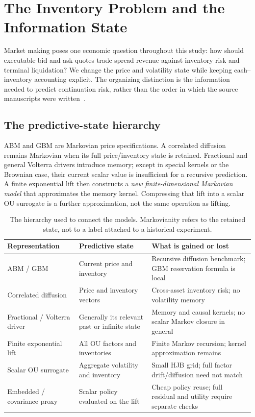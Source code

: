 \chapter{The Inventory Problem and the Information State}
\label{ch:common}
Market making poses one economic question throughout this study: how should executable bid and ask quotes trade spread revenue against inventory risk and terminal liquidation? We change the price and volatility state while keeping cash--inventory accounting explicit. The organizing distinction is the information needed to predict continuation risk, rather than the order in which the source manuscripts were written~\cite{hft1,hft2}.

\section{The predictive-state hierarchy}
ABM and GBM are Markovian price specifications. A correlated diffusion remains Markovian when its full price/inventory state is retained. Fractional and general Volterra drivers introduce memory; except in special kernels or the Brownian case, their current scalar value is insufficient for a recursive prediction. A finite exponential lift then constructs a \emph{new finite-dimensional Markovian model} that approximates the memory kernel. Compressing that lift into a scalar OU surrogate is a further approximation, not the same operation as lifting.

\begin{table}[htbp]\centering\small
\begin{tabularx}{\textwidth}{@{}p{}p{}X@{}}\toprule
Representation & Predictive state & What is gained or lost\\\midrule
ABM / GBM & Current price and inventory & Recursive diffusion benchmark; GBM reservation formula is local\\
Correlated diffusion & Price and inventory vectors & Cross-asset inventory risk; no volatility memory\\
Fractional / Volterra driver & Generally its relevant past or infinite state & Memory and causal kernels; no scalar Markov closure in general\\
Finite exponential lift & All OU factors and inventories & Finite Markov recursion; kernel approximation remains\\
Scalar OU surrogate & Aggregate volatility and inventory & Small HJB grid; full factor drift/diffusion need not match\\
Embedded / covariance proxy & Scalar policy evaluated on the lift & Cheap policy reuse; full residual and utility require separate checks\\\bottomrule
\end{tabularx}
\caption{The hierarchy used to connect the models. Markovianity refers to the retained state, not to a label attached to a historical experiment.}
\label{tab:model-hierarchy}
\end{table}

